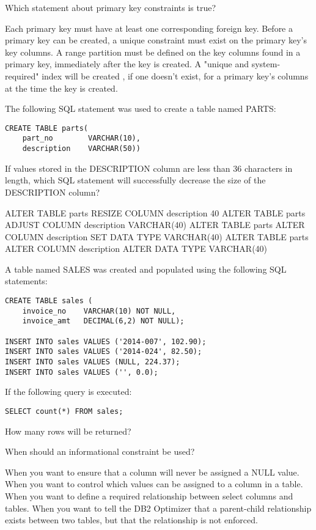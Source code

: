 \documentclass[11pt]{exam}
\begin{document}
\begin{questions}
\newpage
\question[1]
Which statement about primary key constraints is true?
\begin{choices}
\choice Each primary key must have at least one corresponding foreign key.
\choice Before a primary key can be created, a unique constraint must exist on the primary key's key
columns.
\choice A range partition must be defined on the key columns found in a primary key, immediately after
the key is created.
\choice A "unique and system-required" index will be created , if one doesn't exist, for a primary key's
columns at the time the key is created.
\end{choices}

\question[1]
The following SQL statement was used to create a table named PARTS:
\begin{verbatim}
CREATE TABLE parts(
	part_no        VARCHAR(10),
	description    VARCHAR(50))
\end{verbatim}
If values stored in the DESCRIPTION column are less than 36 characters in length, which SQL statement will
successfully decrease the size of the DESCRIPTION column?
\begin{choices}
\choice ALTER TABLE parts RESIZE COLUMN description 40
\choice ALTER TABLE parts ADJUST COLUMN description VARCHAR(40)
\choice ALTER TABLE parts ALTER COLUMN description SET DATA TYPE VARCHAR(40)
\choice ALTER TABLE parts ALTER COLUMN description ALTER DATA TYPE VARCHAR(40)
\end{choices}

\question[1]
A table named SALES was created and populated using the following SQL statements:
\begin{verbatim}
CREATE TABLE sales (
	invoice_no    VARCHAR(10) NOT NULL,
	invoice_amt   DECIMAL(6,2) NOT NULL);
	
INSERT INTO sales VALUES ('2014-007', 102.90);
INSERT INTO sales VALUES ('2014-024', 82.50);
INSERT INTO sales VALUES (NULL, 224.37);
INSERT INTO sales VALUES ('', 0.0);
\end{verbatim}
If the following query is executed:
\begin{verbatim}
SELECT count(*) FROM sales;
\end{verbatim}
How many rows will be returned?
\begin{choices}
\end{choices}

\newpage
\question[1]
When should an informational constraint be used?
\begin{choices}
\choice When you want to ensure that a column will never be assigned a NULL value.
\choice When you want to control which values can be assigned to a column in a table.
\choice When you want to define a required relationship between select columns and tables.
\choice When you want to tell the DB2 Optimizer that a parent-child relationship exists between two tables, but that the relationship is not enforced.
\end{choices}


\end{questions}
\end{document}
